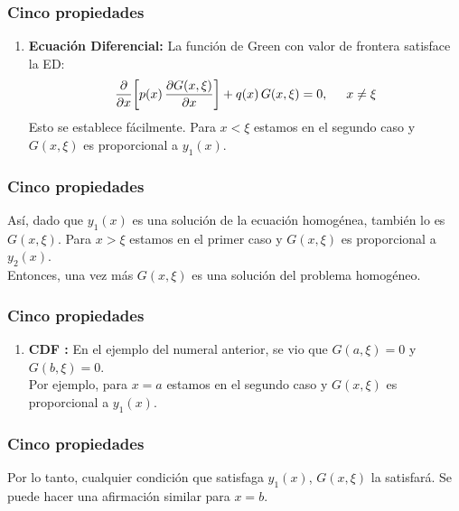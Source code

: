 \documentclass[12pt]{beamer}
\begin{document}
\begin{frame}
\frametitle{Cinco propiedades}
\begin{enumerate}[<+->]
\item \textbf{Ecuación Diferencial: } La función de Green con valor de frontera satisface la ED:
\pause
\begin{align*}
\pdv{x} \bigg[ p (x) \, \pdv{G (x, \xi)}{x} \bigg] + q (x) \, G (x, \xi) = 0, \hspace{0.5cm} x \neq \xi
\end{align*}
Esto se establece fácilmente. \pause Para $x < \xi$ estamos en el  segundo caso y $G (x, \xi)$ es proporcional a $y_{1} (x)$.
\seti
\end{enumerate}
\end{frame}

\begin{frame}
\frametitle{Cinco propiedades}
Así, dado que $y_{1} (x)$ es una solución de la ecuación homogénea, también lo es $G (x, \xi)$. Para $x > \xi$ estamos en el primer caso y $G (x, \xi)$ es proporcional a $y_{2} (x)$.
\\
\bigskip
\pause
Entonces, una vez más $G (x, \xi)$ es una solución del problema homogéneo.
\end{frame}

\begin{frame}
\frametitle{Cinco propiedades}
\begin{enumerate}[<+->]
\conti
\item \textbf{CDF :} En el ejemplo del numeral anterior, se vio que $G (a, \xi) = 0$ y $G (b, \xi) = 0$.
\\
\bigskip
\pause
Por ejemplo, para $x = a$ estamos en el segundo caso y $G (x, \xi)$ es proporcional a $y_{1} (x)$.
\seti
\end{enumerate}
\end{frame}

\begin{frame}
\frametitle{Cinco propiedades}
Por lo tanto, cualquier condición que satisfaga $y_{1} (x)$, $G (x, \xi)$ la satisfará. Se puede hacer una afirmación similar para $x = b$.
\end{frame}
\end{document}
